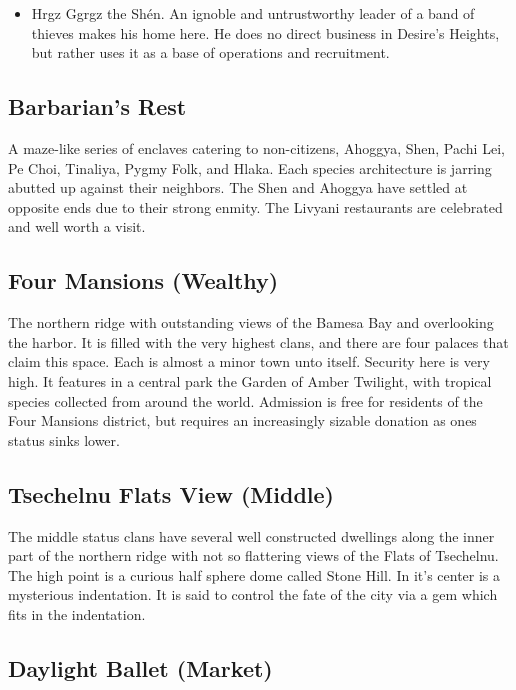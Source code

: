 \begin{itemize}
\item Hrgz Ggrgz the Shén. An ignoble and untrustworthy leader of a band of thieves makes his home here. He does no direct business in Desire's Heights, but rather uses it as a base of operations and recruitment.
\end{itemize}

\subsection{Barbarian's Rest}

A maze-like series of enclaves catering to non-citizens, Ahoggya, Shen, Pachi Lei, Pe Choi, Tinaliya, Pygmy Folk, and Hlaka. Each species architecture is jarring abutted up against their neighbors. The Shen and Ahoggya have settled at opposite ends due to their strong enmity. The Livyani restaurants are celebrated and well worth a visit.

\subsection{Four Mansions (Wealthy)}

The northern ridge with outstanding views of the Bamesa Bay and overlooking the harbor. It is filled with the very highest clans, and there are four palaces that claim this space. Each is almost a minor town unto itself. Security here is very high. It features in a central park the Garden of Amber Twilight, with tropical species collected from around the world. Admission is free for residents of the Four Mansions district, but requires an increasingly sizable donation as ones status sinks lower. 

\subsection{Tsechelnu Flats View (Middle)}
The middle status clans have several well constructed dwellings along the inner part of the northern ridge with not so flattering views of the Flats of Tsechelnu. The high point is a curious half sphere dome called Stone Hill. In it's center is a mysterious indentation. It is said to control the fate of the city via a gem which fits in the indentation.
  
\subsection{Daylight Ballet (Market)}

